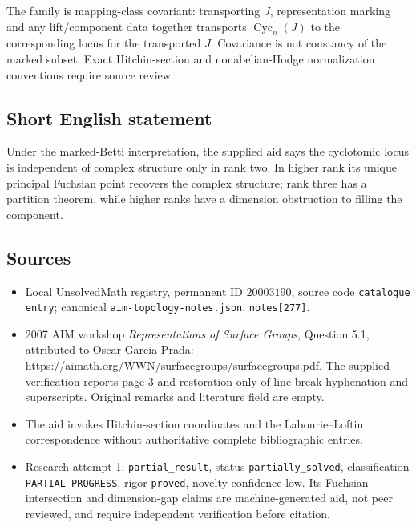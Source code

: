 \documentclass[11pt]{article}
\begin{document}
The family is mapping-class covariant: transporting $J$, representation marking and any lift/component data together transports $\operatorname{Cyc}_n(J)$ to the corresponding locus for the transported $J$. Covariance is not constancy of the marked subset. Exact Hitchin-section and nonabelian-Hodge normalization conventions require source review.
\subsection{Short English statement}
Under the marked-Betti interpretation, the supplied aid says the cyclotomic locus is independent of complex structure only in rank two. In higher rank its unique principal Fuchsian point recovers the complex structure; rank three has a partition theorem, while higher ranks have a dimension obstruction to filling the component.
\subsection{Sources}
\begin{itemize}
\item Local UnsolvedMath registry, permanent ID $20003190$, source code \texttt{catalogue entry}; canonical \texttt{aim-topology-notes.json}, \texttt{notes[277]}.
\item 2007 AIM workshop \emph{Representations of Surface Groups}, Question 5.1, attributed to Oscar Garcia-Prada: \url{https://aimath.org/WWN/surfacegroups/surfacegroups.pdf}. The supplied verification reports page 3 and restoration only of line-break hyphenation and superscripts. Original remarks and literature field are empty.
\item The aid invokes Hitchin-section coordinates and the Labourie--Loftin correspondence without authoritative complete bibliographic entries.
\item Research attempt 1: \texttt{partial\_result}, status \texttt{partially\_solved}, classification \texttt{PARTIAL-PROGRESS}, rigor \texttt{proved}, novelty confidence low. Its Fuchsian-intersection and dimension-gap claims are machine-generated aid, not peer reviewed, and require independent verification before citation.
\end{itemize}
\end{document}
